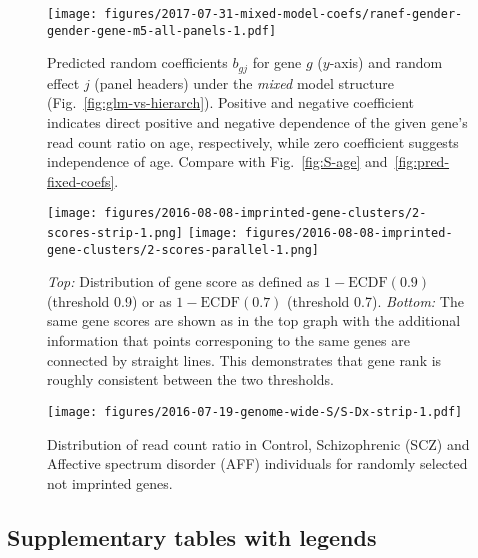 \documentclass[letterpaper]{article}
\begin{document}
\begin{figure}[H]
\begin{center}
\texttt{[image: figures/2017-07-31-mixed-model-coefs/ranef-gender-gender-gene-m5-all-panels-1.pdf]}
\end{center}
\caption{
Predicted random coefficients \(b_{gj}\) for gene \(g\) (\(y\)-axis) and
random effect \(j\) (panel headers) under the \emph{mixed} model structure
(Fig.~\ref{fig:glm-vs-hierarch}). Positive and negative coefficient indicates direct positive and
negative dependence of the given gene's read count ratio on age, respectively,
while zero coefficient suggests independence of age.  Compare with
Fig.~\ref{fig:S-age} and~\ref{fig:pred-fixed-coefs}.
}
\label{fig:pred-rnd-coefs}
\end{figure}

\begin{figure}[H]
\begin{center}
\texttt{[image: figures/2016-08-08-imprinted-gene-clusters/2-scores-strip-1.png]}
\texttt{[image: figures/2016-08-08-imprinted-gene-clusters/2-scores-parallel-1.png]}
\end{center}
\caption{
\emph{Top:} Distribution of gene score as defined as \(1 - \mathrm{ECDF}(0.9)\) (threshold
0.9) or as \(1 - \mathrm{ECDF}(0.7)\) (threshold 0.7).
\emph{Bottom:} The same gene scores are shown as in the top graph with the
additional information that points corresponing to the same genes are
connected by straight lines. This demonstrates that gene rank is roughly consistent between the two
thresholds.
}
\label{fig:2-scores}
\end{figure}

\begin{figure}[H]
\begin{center}
\texttt{[image: figures/2016-07-19-genome-wide-S/S-Dx-strip-1.pdf]}
\end{center}
\caption{Distribution of read count ratio in Control, Schizophrenic (SCZ) and
Affective spectrum disorder (AFF) individuals for randomly selected not
imprinted genes.}
\label{fig:S-Dx-rnd-genes}
\end{figure}

\clearpage

\subsection{Supplementary tables with legends}

\setcounter{table}{0}
\makeatletter 
\renewcommand{\thetable}{S\@arabic\c@table}
\makeatother
\end{document}
